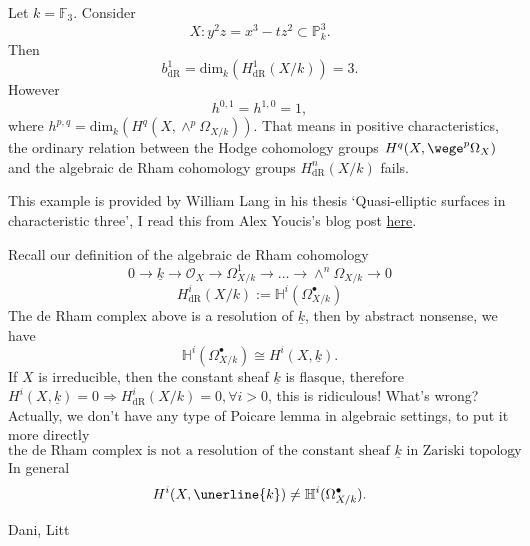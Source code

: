 \documentclass[main.tex]{subfiles}
\begin{document}
\begin{example}
Let $k=\mathbb{F}_{3}$. Consider 
$$X: y^{2}z=x^{3}-tz^{2}\subset \mathbb{P}_{k}^{3}.$$
Then $$b_{\mathrm{dR}}^{1}=\mathrm{dim}_{k}(H^{1}_{\mathrm{dR}}(X/k))=3.$$
However 
$$h^{0,1}=h^{1,0}=1,$$
where $h^{p,q}=\mathrm{dim}_{k}(H^{q}(X,\wedge^{p}\Omega_{X/k}))$. That means in positive characteristics, the ordinary relation between the Hodge cohomology groups $H^{q}(X,\wege^{p}\Omega_{X})$ and the algebraic de Rham cohomology groups $H_{\mathrm{dR}}^{n}(X/k)$ fails. 

\end{example}
\begin{remark}
This example is provided by William Lang in his thesis `Quasi-elliptic surfaces in characteristic three', I read this from Alex Youcis's blog post \href{https://ayoucis.wordpress.com/2015/07/22/algebraic-de-rham-cohomology-and-the-degeneration-of-the-hodge-spectral-sequencethe/#more-3561}{here}.
\end{remark}
\begin{remark}[$X$ irreucible, then $H_{\mathrm{dR}}^{i}(X/k)=0, \forall i>0$?(This cannot be true)]
Recall our definition of the algebraic de Rham cohomology 
$$0\rightarrow \underline{k}\rightarrow \mathcal{O}_{X}\rightarrow \Omega_{X/k}^{1}\rightarrow \dots \rightarrow \wedge^{n}\Omega_{X/k}\rightarrow 0$$
$$H^{i}_{\mathrm{dR}}(X/k):=\mathbb{H}^{i}(\Omega_{X/k}^{\bullet})$$
The de Rham complex above is a resolution of $\underline{k}$, then by abstract nonsense, we have 
$$\mathbb{H}^{i}(\Omega_{X/k}^{\bullet})\cong H^{i}(X,\underline{k}).$$
If $X$ is irreducible, then the constant sheaf $\underline{k}$ is flasque, therefore $H^{i}(X,\underline{k})=0\Rightarrow H^{i}_{\mathrm{dR}}(X/k)=0, \forall i>0$, this is ridiculous! What's wrong? Actually, we don't have any type of Poicare lemma in algebraic settings, to put it more directly
$$\text{the de Rham complex is not a resolution of the constant sheaf $\underline{k}$ in Zariski topology}.$$
In general 
$$H^{i}(X,\unerline{k})\neq \mathbb{H}^{i}(\Omega_{X/k}^{\bullet}).$$
\end{remark}


\begin{example}

\end{example}

\begin{example}
Dani, Litt
\end{example}
\begin{example}

\end{example}
\end{document}
